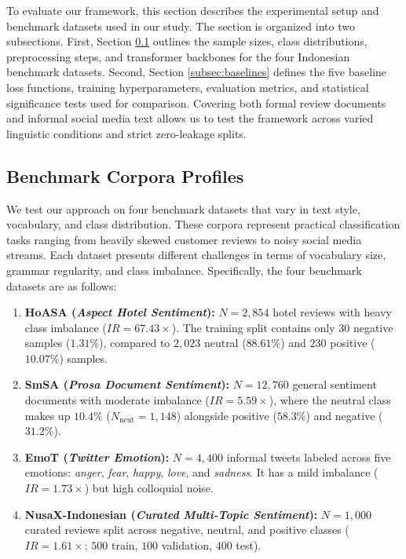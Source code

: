 \documentclass[10pt,journal,compsoc]{IEEEtran}
\begin{document}
To evaluate our framework, this section describes the experimental setup and benchmark datasets used in our study. The section is organized into two subsections. First, Section \ref{subsec:corpora} outlines the sample sizes, class distributions, preprocessing steps, and transformer backbones for the four Indonesian benchmark datasets. Second, Section \ref{subsec:baselines} defines the five baseline loss functions, training hyperparameters, evaluation metrics, and statistical significance tests used for comparison. Covering both formal review documents and informal social media text allows us to test the framework across varied linguistic conditions and strict zero-leakage splits.

\begin{table}[!t]
\caption{Comprehensive Performance and Statistical Comparison Across All Four Benchmarks Against State-of-the-Art Imbalance Baselines}
\label{tab:tpami_comparisons}
\centering
\footnotesize
\setlength{\tabcolsep}{2.8pt}

\end{table}

\subsection{Benchmark Corpora Profiles}
\label{subsec:corpora}

We test our approach on four benchmark datasets \cite{wilie2020indonlu, koto2020indolem, koto2021indobertweet, cahyawijaya2023nusacrowd, winata2023nusax} that vary in text style, vocabulary, and class distribution. These corpora represent practical classification tasks ranging from heavily skewed customer reviews to noisy social media streams. Each dataset presents different challenges in terms of vocabulary size, grammar regularity, and class imbalance. Specifically, the four benchmark datasets are as follows:

\begin{enumerate}
    \item \textbf{HoASA (\textit{Aspect Hotel Sentiment}):} $N=2,854$ hotel reviews with heavy class imbalance ($IR = 67.43\times$). The training split contains only 30 negative samples ($1.31\%$), compared to $2,023$ neutral ($88.61\%$) and $230$ positive ($10.07\%$) samples.
    \item \textbf{SmSA (\textit{Prosa Document Sentiment}):} $N=12,760$ general sentiment documents with moderate imbalance ($IR = 5.59\times$), where the neutral class makes up $10.4\%$ ($N_{\text{neut}} = 1,148$) alongside positive ($58.3\%$) and negative ($31.2\%$).
    \item \textbf{EmoT (\textit{Twitter Emotion}):} $N=4,400$ informal tweets labeled across five emotions: \textit{anger}, \textit{fear}, \textit{happy}, \textit{love}, and \textit{sadness}. It has a mild imbalance ($IR = 1.73\times$) but high colloquial noise.
    \item \textbf{NusaX-Indonesian (\textit{Curated Multi-Topic Sentiment}):} $N=1{,}000$ curated reviews \cite{winata2023nusax} split across negative, neutral, and positive classes ($IR = 1.61\times$; $500$ train, $100$ validation, $400$ test).
\end{enumerate}
\end{document}
